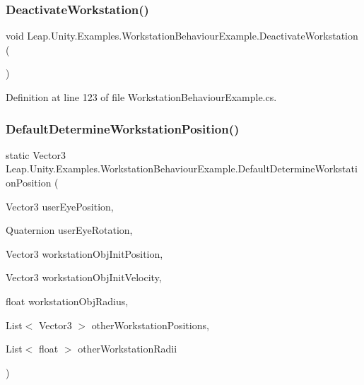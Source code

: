 \subsubsection{\texorpdfstring{DeactivateWorkstation()}{DeactivateWorkstation()}}
{\footnotesize\ttfamily void Leap.\+Unity.\+Examples.\+Workstation\+Behaviour\+Example.\+Deactivate\+Workstation (\begin{DoxyParamCaption}{ }\end{DoxyParamCaption})}



Definition at line 123 of file Workstation\+Behaviour\+Example.\+cs.

\mbox{\label{class_leap_1_1_unity_1_1_examples_1_1_workstation_behaviour_example_a45e1d9a2aff57e76f3f41de59aa40a35}} 
\subsubsection{\texorpdfstring{DefaultDetermineWorkstationPosition()}{DefaultDetermineWorkstationPosition()}}
{\footnotesize\ttfamily static Vector3 Leap.\+Unity.\+Examples.\+Workstation\+Behaviour\+Example.\+Default\+Determine\+Workstation\+Position (\begin{DoxyParamCaption}\item[{Vector3}]{user\+Eye\+Position,  }\item[{Quaternion}]{user\+Eye\+Rotation,  }\item[{Vector3}]{workstation\+Obj\+Init\+Position,  }\item[{Vector3}]{workstation\+Obj\+Init\+Velocity,  }\item[{float}]{workstation\+Obj\+Radius,  }\item[{List$<$ Vector3 $>$}]{other\+Workstation\+Positions,  }\item[{List$<$ float $>$}]{other\+Workstation\+Radii }\end{DoxyParamCaption})\hspace{0.3cm}{\ttfamily [static]}}



